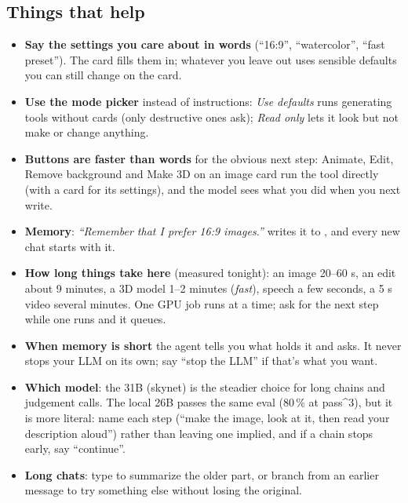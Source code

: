 \subsection*{Things that help}
\begin{itemize}[leftmargin=*]
\item \textbf{Say the settings you care about in words} (``16:9'', ``watercolor'', ``fast preset''). The card fills them in; whatever you leave out uses sensible defaults you can still change on the card.
\item \textbf{Use the mode picker} instead of instructions: \emph{Use defaults} runs generating tools without cards (only destructive ones ask); \emph{Read only} lets it look but not make or change anything.
\item \textbf{Buttons are faster than words} for the obvious next step: Animate, Edit, Remove background and Make 3D on an image card run the tool directly (with a card for its settings), and the model sees what you did when you next write.
\item \textbf{Memory}: \emph{``Remember that I prefer 16:9 images.''} writes it to , and every new chat starts with it.
\item \textbf{How long things take here} (measured tonight): an image 20--60 s, an edit about 9 minutes, a 3D model 1--2 minutes (\emph{fast}), speech a few seconds, a 5 s video several minutes. One GPU job runs at a time; ask for the next step while one runs and it queues.
\item \textbf{When memory is short} the agent tells you what holds it and asks. It never stops your LLM on its own; say ``stop the LLM'' if that's what you want.
\item \textbf{Which model}: the 31B (skynet) is the steadier choice for long chains and judgement calls. The local 26B passes the same eval (80\,\% at pass\textasciicircum{}3), but it is more literal: name each step (``make the image, look at it, then read your description aloud'') rather than leaving one implied, and if a chain stops early, say ``continue''.
\item \textbf{Long chats}: type  to summarize the older part, or branch from an earlier message to try something else without losing the original.
\end{itemize}
